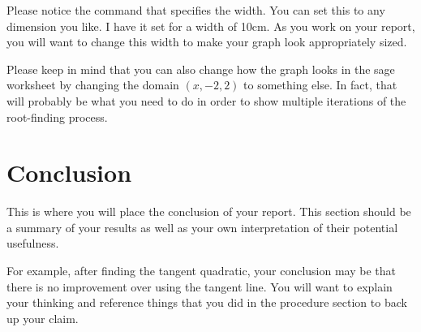 \documentclass[11pt]{article}
\begin{document}
\begin{report}
Please notice the command that specifies the width. You can set this to any dimension you like. I have it set for a width of 10cm. As you work on your report, you will want to change this width to make your graph look appropriately sized.

Please keep in mind that you can also change how the graph looks in the sage worksheet by changing the domain $(x,-2,2)$ to something else. In fact, that will probably be what you need to do in order to show multiple iterations of the root-finding process.

\section{Conclusion}
This is where you will place the conclusion of your report. This section should be a summary of your results as well as your own interpretation of their potential usefulness.

For example, after finding the tangent quadratic, your conclusion may be that there is no improvement over using the tangent line. You will want to explain your thinking and reference things that you did in the procedure section to back up your claim.

\end{report}
\end{document}

